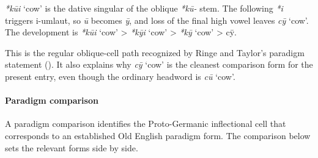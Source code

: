 \documentclass[
  british,
  a4paper,
]{article}
\providecommand{\Recon}[1]{\emph{*#1}}
\begin{document}
\Recon{kūi} `cow' is the dative singular of the oblique \emph{*kū-}
stem. The following \emph{*i} triggers i-umlaut, so \emph{ū} becomes
\emph{ȳ}, and loss of the final high vowel leaves {\emph{cȳ}} `cow'. The
development is \Recon{kūi} `cow' \textgreater{} \Recon{kȳi} `cow'
\textgreater{} \Recon{kȳ} `cow' \textgreater{} cȳ.

This is the regular oblique-cell path recognized by Ringe and Taylor's
paradigm statement (). It also explains why {\emph{cȳ}} `cow' is the
cleanest comparison form for the present entry, even though the ordinary
headword is {\emph{cū}} `cow'.

\paragraph{Paradigm comparison}\label{paradigm-comparison-3}

A paradigm comparison identifies the Proto-Germanic inflectional cell
that corresponds to an established Old English paradigm form. The
comparison below sets the relevant forms side by side.
\end{document}
